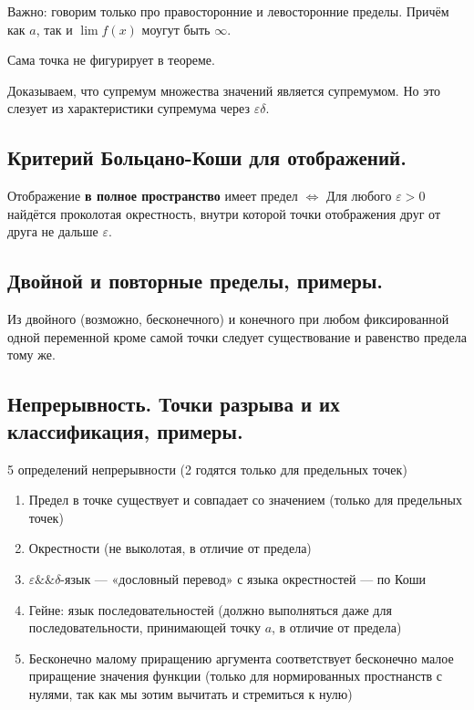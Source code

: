 \documentclass[12pt, a4paper]{article}
\begin{document}
Важно: говорим только про правосторонние и левосторонние пределы.
Причём как $a$, так и $\lim f(x)$ моугут быть $\infty$.

Сама точка не фигурирует в теореме.

Доказываем, что супремум множества значений является супремумом. 
Но это слезует из характеристики супремума через $\varepsilon\delta$.


\subsection{Критерий Больцано-Коши для отображений.}

Отображение \textbf{в полное пространство} имеет предел $\Longleftrightarrow$ 
Для любого $\varepsilon > 0$ найдётся проколотая окрестность, 
внутри которой точки отображения друг от друга не дальше $\varepsilon$.


\subsection{Двойной и повторные пределы, примеры.}

Из двойного (возможно, бесконечного) 
и конечного при любом фиксированной одной переменной кроме самой точки
следует существование и равенство предела тому же.


\subsection{Непрерывность. Точки разрыва и их классификация, примеры.}

5 определений непрерывности (2 годятся только для предельных точек)

\begin{enumerate}
    \item Предел в точке существует и совпадает со значением (только для предельных точек)
    \item Окрестности (не выколотая, в отличие от предела)
    \item $\varepsilon \&\& \delta$-язык — «дословный перевод» с языка окрестностей — по Коши
    \item Гейне: язык последовательностей (должно выполняться даже для последовательности, принимающей точку $a$, в отличие от предела)
    \item Бесконечно малому приращению аргумента соответствует бесконечно малое приращение значения функции 
    (только для нормированных простнанств с нулями, так как мы зотим вычитать и стремиться к нулю)
\end{enumerate}
\end{document}
